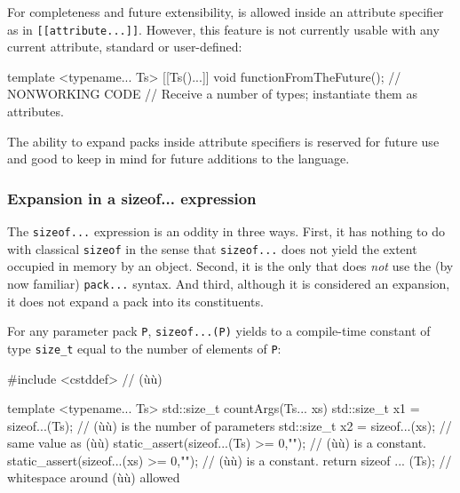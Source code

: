 \noindent For completeness and future extensibility,  is
allowed inside an attribute specifier as in \lstinline![[attribute...]]!.
However, this feature is not currently usable with any current
attribute, standard or user-defined:

\begin{emcppslisting}[emcppsignore={gibberish}]
template <typename... Ts>
[[Ts()...]] void functionFromTheFuture();
    // NONWORKING CODE
    // Receive a number of types; instantiate them as attributes.
\end{emcppslisting}
    

\noindent The ability to expand packs inside attribute specifiers is reserved for
future use and good to keep in mind for future additions to the
language.

\subsubsection[Expansion in a \lstinline!sizeof...! expression]{Expansion in a {\SubsubsecCode sizeof...} expression}\label{expansion-in-a-sizeof...-expression}

The \lstinline!sizeof...! expression is an oddity in three ways. First, it
has nothing to do with classical \lstinline!sizeof! in the sense that
\lstinline!sizeof...! does not yield the extent occupied in memory by an
object. Second, it is the only  that
does \emph{not} use the (by now familiar) \lstinline!pack...! syntax. And
third, although it is considered an expansion, it does not expand a pack
into its constituents.

For any parameter pack \lstinline!P!, \lstinline!sizeof...(P)! yields to a
compile-time constant of type \lstinline!size_t! equal to the number of
elements of \lstinline!P!:

\begin{emcppshiddenlisting}[emcppsbatch=e32]
#include <cstddef>  // (ù{}ù)
\end{emcppshiddenlisting}
\begin{emcppslisting}[emcppsbatch=e32]
template <typename... Ts>
std::size_t countArgs(Ts... xs)
{
    std::size_t x1 = sizeof...(Ts);        // (ù{}ù) is the number of parameters
    std::size_t x2 = sizeof...(xs);        // same value as (ù{}ù)
    static_assert(sizeof...(Ts) >= 0,"");  // (ù{}ù) is a constant.
    static_assert(sizeof...(xs) >= 0,"");  // (ù{}ù) is a constant.
    return sizeof ... (Ts);                // whitespace around (ù{}ù) allowed
}
\end{emcppslisting}
    


